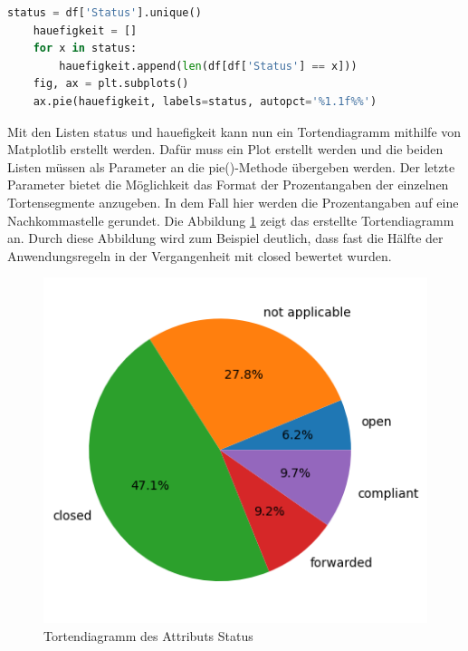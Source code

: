 \begin{lstlisting}[language = python, caption={Visualisierung des Attributs Status},captionpos=b, label = lst:StatusPie, floatplacement=H]
    status = df['Status'].unique()
    hauefigkeit = []
    for x in status:
        hauefigkeit.append(len(df[df['Status'] == x]))
    fig, ax = plt.subplots()
    ax.pie(hauefigkeit, labels=status, autopct='%1.1f%%')
\end{lstlisting}

Mit den Listen \glqq status\grqq{} und \glqq hauefigkeit\grqq{} kann nun ein Tortendiagramm mithilfe von Matplotlib erstellt werden.
Dafür muss ein Plot erstellt werden und die beiden Listen müssen als Parameter an die pie()-Methode übergeben werden.
Der letzte Parameter bietet die Möglichkeit das Format der Prozentangaben der einzelnen Tortensegmente anzugeben. In dem Fall hier werden die Prozentangaben auf eine Nachkommastelle
gerundet. Die Abbildung \ref*{fig:StatusPie} zeigt das erstellte Tortendiagramm an. Durch diese Abbildung wird zum Beispiel deutlich, dass fast die Hälfte der 
Anwendungsregeln in der Vergangenheit mit \glqq closed\grqq{} bewertet wurden.

\begin{figure}[H]
    \centering
    \includegraphics[width = \textwidth/2]{abbildungen/Status.png}
    \caption{Tortendiagramm des Attributs Status}
    \label{fig:StatusPie}
\end{figure}

